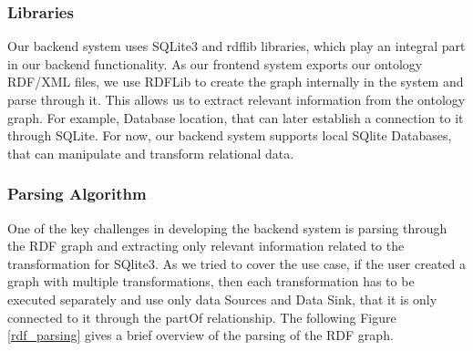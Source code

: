 \documentclass[sigconf, nonacm]{acmart}
\begin{document}
\subsubsection{Libraries}
Our backend system uses SQLite3\cite{python_sqlite3} and rdflib\cite{rdflib} libraries, which play an integral part in our backend functionality. As our frontend system exports our ontology RDF/XML files, we use RDFLib to create the graph internally in the system and parse through it. This allows us to extract relevant information from the ontology graph. For example, Database location, that can later establish a connection to it through SQLite. For now, our backend system supports local  SQlite Databases, that can manipulate and transform relational data.
\subsubsection{Parsing Algorithm}
One of the key challenges in developing the backend system is parsing through the RDF graph and extracting only relevant information related to the transformation for SQlite3. As we tried to cover the use case, if the user created a graph with multiple transformations, then each transformation has to be executed separately and use only data Sources and Data Sink, that it is only connected to it through the partOf relationship. The following Figure  \ref{rdf_parsing} gives a brief overview of the parsing of the RDF graph. 
\end{document}
